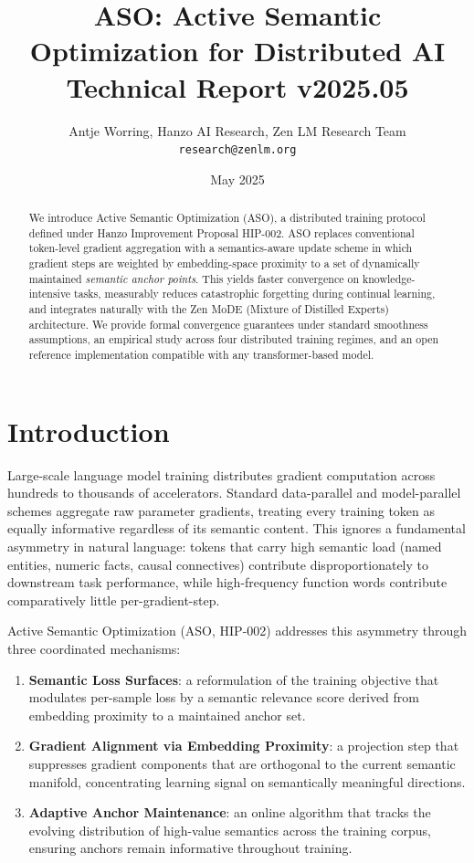 \documentclass[11pt,a4paper]{article}
\title{\textbf{ASO: Active Semantic Optimization for Distributed AI}\\
\large Technical Report v2025.05}
\author{Antje Worring, Hanzo AI Research, Zen LM Research Team\\
\texttt{research@zenlm.org}}
\date{May 2025}
\begin{document}
\maketitle

\begin{abstract}
We introduce Active Semantic Optimization (ASO), a distributed training protocol defined
under Hanzo Improvement Proposal HIP-002. ASO replaces conventional token-level gradient
aggregation with a semantics-aware update scheme in which gradient steps are weighted by
embedding-space proximity to a set of dynamically maintained \emph{semantic anchor points}.
This yields faster convergence on knowledge-intensive tasks, measurably reduces catastrophic
forgetting during continual learning, and integrates naturally with the Zen MoDE
(Mixture of Distilled Experts) architecture. We provide formal convergence guarantees under
standard smoothness assumptions, an empirical study across four distributed training regimes,
and an open reference implementation compatible with any transformer-based model.
\end{abstract}

\tableofcontents
\newpage

\section{Introduction}
\label{sec:intro}

Large-scale language model training distributes gradient computation across hundreds to
thousands of accelerators. Standard data-parallel and model-parallel schemes aggregate
raw parameter gradients, treating every training token as equally informative regardless
of its semantic content. This ignores a fundamental asymmetry in natural language: tokens
that carry high semantic load (named entities, numeric facts, causal connectives) contribute
disproportionately to downstream task performance, while high-frequency function words
contribute comparatively little per-gradient-step.

Active Semantic Optimization (ASO, HIP-002) addresses this asymmetry through three
coordinated mechanisms:

\begin{enumerate}
    \item \textbf{Semantic Loss Surfaces}: a reformulation of the training objective that
          modulates per-sample loss by a semantic relevance score derived from embedding
          proximity to a maintained anchor set.
    \item \textbf{Gradient Alignment via Embedding Proximity}: a projection step that
          suppresses gradient components that are orthogonal to the current semantic
          manifold, concentrating learning signal on semantically meaningful directions.
    \item \textbf{Adaptive Anchor Maintenance}: an online algorithm that tracks the
          evolving distribution of high-value semantics across the training corpus,
          ensuring anchors remain informative throughout training.
\end{enumerate}
\end{document}
